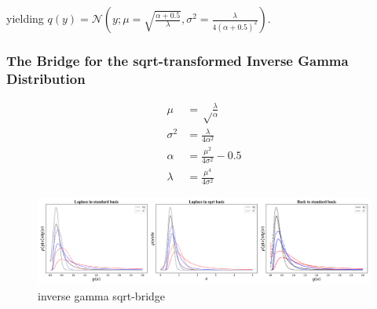 yielding $q(y) = \mathcal{N}(y; \mu = \sqrt{\frac{\alpha+0.5}{\lambda}}, \sigma^2 = \frac{\lambda}{4 (\alpha+0.5)^2})$. 

\subsubsection{The Bridge for the sqrt-transformed Inverse Gamma Distribution}

\begin{subequations}
\begin{align}
\mu &= \sqrt\frac{\lambda}{\alpha} \\
\sigma^2 &= \frac{\lambda}{4\alpha^2} \\
\alpha &= \frac{\mu^2}{4\sigma^2}-0.5\\
\lambda &= \frac{\mu^4}{4\sigma^2}
\end{align}
\end{subequations}

\begin{figure}[!htb]
	\centering
	\includegraphics[width=\textwidth]{figures/inverse_gamma_sqrt_bridge.pdf}
	\caption{inverse gamma sqrt-bridge}
	\label{fig:inverse_gamma_sqrt_bridge}
\end{figure}